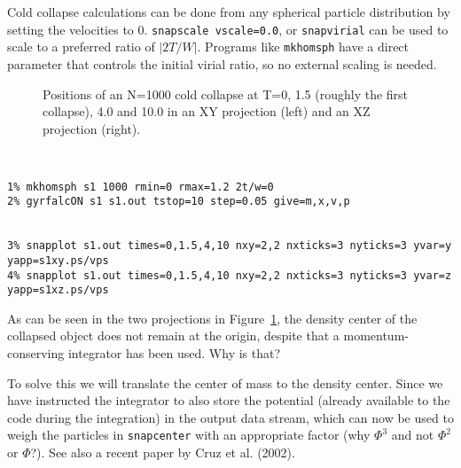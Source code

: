 Cold collapse calculations can be done from any spherical particle
distribution by setting the velocities to 0. {\tt snapscale vscale=0.0},
or {\tt snapvirial} can be used to scale to a preferred ratio of $|2T/W|$.
Programs like {\tt mkhomsph} have a direct parameter that controls
the initial virial ratio, so no external scaling is needed.



\begin{figure}[htb]
\caption{Positions of an N=1000 cold collapse at T=0, 1.5 (roughly
the first collapse), 4.0 and 10.0 in an XY projection (left) 
and an XZ projection (right).}
\label{f:s1xy}
\end{figure}

\footnotesize\begin{verbatim}


1% mkhomsph s1 1000 rmin=0 rmax=1.2 2t/w=0
2% gyrfalcON s1 s1.out tstop=10 step=0.05 give=m,x,v,p


3% snapplot s1.out times=0,1.5,4,10 nxy=2,2 nxticks=3 nyticks=3 yvar=y yapp=s1xy.ps/vps
4% snapplot s1.out times=0,1.5,4,10 nxy=2,2 nxticks=3 nyticks=3 yvar=z yapp=s1xz.ps/vps

\end{verbatim}\normalsize

As can be seen in the two projections in Figure~\ref{f:s1xy}, the density center
of the collapsed object does not remain at the origin, despite that a 
momentum-conserving integrator has been used. Why is that?

To solve this we will translate the center of mass to the density center. Since
we have instructed the integrator to also store the potential (already
available to the code during the integration) in the output data stream, which
can now be used to weigh the particles in {\tt snapcenter} with an appropriate
factor (why $\Phi^3$ and not $\Phi^2$ or $\Phi$?). See also  a recent
paper by Cruz et al. (2002).

